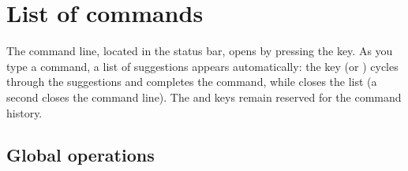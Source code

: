\documentclass[letterpaper,10pt,english]{sphinxmanual}
\begin{document}
\sphinxstepscope


\section{List of commands}
\label{\detokenize{cmd_mode:liste-des-commandes}}\label{\detokenize{cmd_mode:cmd-mode}}\label{\detokenize{cmd_mode::doc}}
\sphinxAtStartPar
The command line, located in the status bar, opens by pressing the  key. As you type a command, a list of suggestions appears automatically: the  key (or ) cycles through the suggestions and completes the command, while  closes the list (a second  closes the command line). The  and  keys remain reserved for the command history.


\subsection{Global operations}
\label{\detokenize{cmd_mode:operations-globales}}\label{\detokenize{cmd_mode:cmd-global}}
\end{document}
